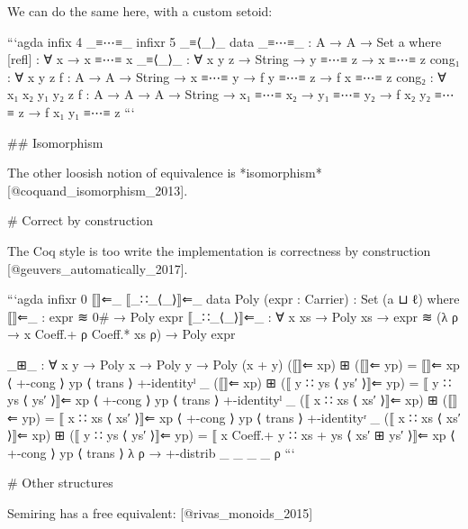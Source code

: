 \documentclass{article}
\begin{document}
We can do the same here, with a custom setoid:

```agda
infix 4 _≡⋯≡_
infixr 5 _≡⟨_⟩_
data _≡⋯≡_ : A → A → Set a where
  [refl] : ∀ {x} →  x ≡⋯≡ x
  _≡⟨_⟩_ : ∀ {x} y {z} → String → y ≡⋯≡ z → x ≡⋯≡ z
  cong₁ : ∀ {x y z} {f : A → A}
        → String
        → x ≡⋯≡ y
        → f y ≡⋯≡ z
        → f x ≡⋯≡ z
  cong₂ : ∀ {x₁ x₂ y₁ y₂ z} {f : A → A → A}
        → String
        → x₁ ≡⋯≡ x₂
        → y₁ ≡⋯≡ y₂
        → f x₂ y₂ ≡⋯≡ z
        → f x₁ y₁ ≡⋯≡ z
```

## Isomorphism

The other loosish notion of equivalence is *isomorphism*
[@coquand_isomorphism_2013].

# Correct by construction

The Coq style is too write the implementation is correctness by construction
[@geuvers_automatically_2017].

```agda
infixr 0 ⟦⟧⇐_ ⟦_∷_⟨_⟩⟧⇐_
data Poly (expr : Carrier) : Set (a ⊔ ℓ) where
  ⟦⟧⇐_  : expr ≋ 0# → Poly expr
  ⟦_∷_⟨_⟩⟧⇐_ : ∀ x xs → Poly xs → expr ≋ (λ ρ → x Coeff.+ ρ Coeff.* xs ρ) → Poly expr

_⊞_ : ∀ {x y} → Poly x → Poly y → Poly (x + y)
(⟦⟧⇐ xp) ⊞ (⟦⟧⇐ yp) = ⟦⟧⇐ xp ⟨ +-cong ⟩ yp ⟨ trans ⟩ +-identityˡ _
(⟦⟧⇐ xp) ⊞ (⟦ y ∷ ys ⟨ ys′ ⟩⟧⇐ yp) = ⟦ y ∷ ys ⟨ ys′ ⟩⟧⇐ xp ⟨ +-cong ⟩ yp ⟨ trans ⟩ +-identityˡ _
(⟦ x ∷ xs ⟨ xs′ ⟩⟧⇐ xp) ⊞ (⟦⟧⇐ yp) = ⟦ x ∷ xs ⟨ xs′ ⟩⟧⇐ xp ⟨ +-cong ⟩ yp ⟨ trans ⟩ +-identityʳ _
(⟦ x ∷ xs ⟨ xs′ ⟩⟧⇐ xp) ⊞ (⟦ y ∷ ys ⟨ ys′ ⟩⟧⇐ yp) = ⟦ x Coeff.+ y ∷ xs + ys ⟨ xs′ ⊞ ys′ ⟩⟧⇐
  xp ⟨ +-cong ⟩ yp ⟨ trans ⟩  λ ρ → +-distrib _ _ _ _ ρ
```

# Other structures

Semiring has a free equivalent: [@rivas_monoids_2015]
\end{document}

